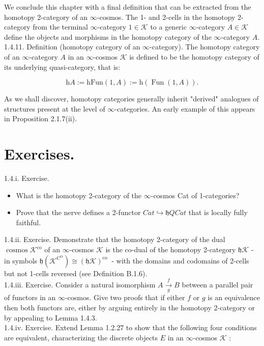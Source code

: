 \documentclass[10pt]{article}
\begin{document}
We conclude this chapter with a final definition that can be extracted from the homotopy 2-category of an $\infty$-cosmos. The 1- and 2-cells in the homotopy 2-category from the terminal $\infty$-category $1 \in \mathcal{K}$ to a generic $\infty$-category $A \in \mathcal{K}$ define the objects and morphisms in the homotopy category of the $\infty$-category $A$.\\
1.4.11. Definition (homotopy category of an $\infty$-category). The homotopy category of an $\infty$-category $A$ in an $\infty$-cosmos $\mathcal{K}$ is defined to be the homotopy category of its underlying quasi-category, that is:

$$
\mathrm{h} A:=\mathrm{hFun}(1, A):=\mathrm{h}(\operatorname{Fun}(1, A)) .
$$

As we shall discover, homotopy categories generally inherit "derived" analogues of structures present at the level of $\infty$-categories. An early example of this appears in Proposition 2.1.7(ii).

\section*{Exercises.}
1.4.i. Exercise.

\begin{itemize}
  \item[(i)] What is the homotopy 2-category of the $\infty$-cosmos Cat of 1-categories?
  \item[(ii)] Prove that the nerve defines a 2-functor $C a t \hookrightarrow \mathfrak{h} Q C a t$ that is locally fully faithful.
\end{itemize}

1.4.ii. Exercise. Demonstrate that the homotopy 2-category of the dual $\operatorname{cosmos} \mathcal{K}^{\mathrm{co}}$ of an $\infty$-cosmos $\mathcal{K}$ is the co-dual of the homotopy 2-category $\mathfrak{h} \mathcal{K}$ - in symbols $\mathfrak{h}\left(\mathcal{K}^{\mathrm{C}^{\mathrm{O}}}\right) \cong(\mathfrak{h} \mathcal{K})^{\text {co }}$ - with the domains and codomains of 2-cells but not 1-cells reversed (see Definition B.1.6).\\
1.4.iii. Exercise. Consider a natural isomorphism $A \xrightarrow[g]{f} B$ between a parallel pair of functors in an $\infty$-cosmos. Give two proofs that if either $f$ or $g$ is an equivalence then both functors are, either by arguing entirely in the homotopy 2-category or by appealing to Lemma 1.4.3.\\
1.4.iv. Exercise. Extend Lemma 1.2.27 to show that the following four conditions are equivalent, characterizing the discrete objects $E$ in an $\infty$-cosmos $\mathcal{K}$ :
\end{document}
